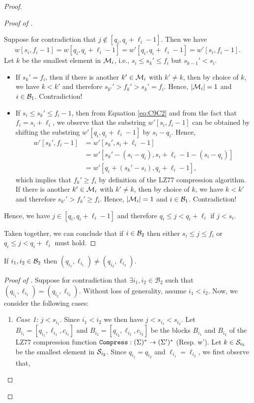 \begin{proof}
\begin{proof}[Proof of ]
\begin{itemize}
        
        Suppose for contradiction that $j\not\in[q_i,q_i+\ell_i-1]$. Then we have 
        \begin{equation}\label{eq:C9C2}
            w[s_i,f_i-1]=w[q_i,q_i+\ell_i-1]=w'[q_i,q_i+\ell_i-1]=w'[s_i,f_i-1].
        \end{equation}
        Let $k$ be the smallest element in $\M_i$, i.e., $s_i\leq s_k'\leq f_i$ but $s_{k-1}'<s_i$. 
        \begin{itemize}
            \item If $s_k'=f_i$, then if there is another $k'\in\M_i$ with $k'\neq k$, then by choice of $k$, we have $k<k'$ and therefore $s_{k'}'>f_k'>s_k'=f_i$. Hence, $|\M_i|= 1$ and $i\in\B_1$. Contradiction!
            \item If $s_i\leq s_k'\leq f_i-1$, then from Equation \eqref{eq:C9C2} and from the fact that $f_i=s_i+\ell_i$, we observe that the substring $w'[s_i,f_i-1]$ can be obtained by shifting the substring $w'[q_i,q_i+\ell_i-1]$ by $s_i-q_i$. Hence,
            \begin{align*}
                w'[s_k',f_i-1] &= w'[s_k',s_i+\ell_i-1]\\
                &=w'[s_k'-(s_i-q_i),s_i+\ell_i-1-(s_i-q_i)]\\
                &=w'[q_i+(s_k'-s_i),q_i+\ell_i-1],
            \end{align*}
            which implies that $f_k'\geq f_i$ by definition of the LZ77 compression algorithm. If there is another $k'\in\M_i$ with $k'\neq k$, then by choice of $k$, we have $k<k'$ and therefore $s_{k'}'>f_k'\geq f_i$. Hence, $|\M_i|=1$ and $i\in\B_1$. Contradiction!
        \end{itemize}
        Hence, we have $j\in[q_i,q_i+\ell_i-1]$ and therefore $q_i\leq j<q_i+\ell_i$ if $j<s_i$.
    \end{itemize}
    Taken together, we can conclude that if $i\in\B_2$ then either $s_i\leq j\leq f_i$ or $q_i\leq j<q_i+\ell_i$ must hold.
\end{proof}

\begin{claim}
    If $i_1,i_2\in\B_2$ then $(q_{i_1},\ell_{i_1})\neq(q_{i_2},\ell_{i_2})$. 
\end{claim}
\begin{proof}[Proof of ]
    Suppose for contradiction that $\exists i_1,i_2 \in \mathcal{B}_2 $ such that $(q_{i_1},\ell_{i_1})=(q_{i_2},\ell_{i_2})$. Without loss of generality, assume $i_1<i_2$. Now, we consider the following cases:
\begin{enumerate}
\label{case:length_cases_total:case:a} \item \emph{Case 1: $j<s_{i_1}$}. 
Since $i_1<i_2$ we then have $j<s_{i_1}<s_{i_2}$. Let $B_{i_1}=[q_{i_1},\ell_{i_1},c_{i_1}]$ and $B_{i_2}=[q_{i_2},\ell_{i_2},c_{i_2}]$ be  the blocks $B_{i_1}$ and $B_{i_2}$ of the LZ77 compression function $\compress:(\Sigma)^*\rightarrow(\Sigma')^*$ (Resp. w'). Let $k \in \S_{i_2}$ be the smallest element in  $\S_{i_2}$. Since $q_{i_1}=q_{i_2}$ and $\ell_{i_1}=\ell_{i_2}$, we first observe that, 


\end{enumerate}
\end{proof}
\end{proof}
